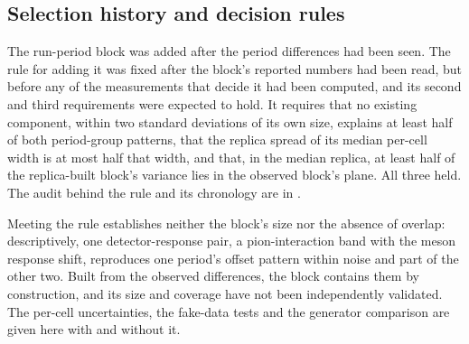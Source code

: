 
\subsection{Selection history and decision rules}
\label{supp:cov16-history}

The run-period block was added after the period differences had been seen. The rule for adding it was fixed after the block's reported numbers had been read, but before any of the measurements that decide it had been computed, and its second and third requirements were expected to hold. It requires that no existing component, within two standard deviations of its own size, explains at least half of both period-group patterns, that the replica spread of its median per-cell width is at most half that width, and that, in the median replica, at least half of the replica-built block's variance lies in the observed block's plane. All three held. The audit behind the rule and its chronology are in .

Meeting the rule establishes neither the block's size nor the absence of overlap: descriptively, one detector-response pair, a pion-interaction band with the meson response shift, reproduces one period's offset pattern within noise and part of the other two. Built from the observed differences, the block contains them by construction, and its size and coverage have not been independently validated. The per-cell uncertainties, the fake-data tests and the generator comparison are given here with and without it.

